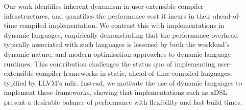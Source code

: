 Our work identifies inherent dynamism in user-extensible compiler infrastructures, and quantifies the performance cost it incurs in their ahead-of-time compiled implementation.
We contrast this with implementations in dynamic languages, empirically demonstrating that the performance overhead typically associated with such languages is lessened by both the workload's dynamic nature, and modern optimisation approaches to dynamic language runtimes.
This contribution challenges the status quo of implementing user-extensible compiler frameworks in static, ahead-of-time compiled languages, typified by LLVM's \ac{mlir}. Instead, we motivate the use of dynamic languages to implement these frameworks,  showing that implementations such as xDSL present a desirable balance of performance with flexibility and fast build times.
